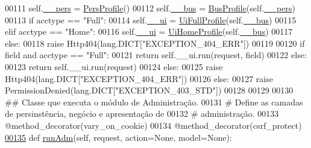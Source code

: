 \begin{DoxyCode}
00111                     self.\hyperlink{classELO_1_1MainUnit_1_1Factory_a68f6640ad3b515e1b8cd48d1554c0779}{\_\_pers} = \hyperlink{classProfile_1_1ProfileUnit_1_1PersProfile}{PersProfile}()
00112                     self.\hyperlink{classELO_1_1MainUnit_1_1Factory_a6a0b7b93046e095779ba54e0a8a4d02c}{\_\_bus} = \hyperlink{classProfile_1_1ProfileUnit_1_1BusProfile}{BusProfile}(self.\hyperlink{classELO_1_1MainUnit_1_1Factory_a68f6640ad3b515e1b8cd48d1554c0779}{\_\_pers})
00113                 \textcolor{keywordflow}{if} acctype == \textcolor{stringliteral}{"Full"}:
00114                     self.\hyperlink{classELO_1_1MainUnit_1_1Factory_a189a44a11e1a66ba69663eb2c598dd7c}{\_\_ui} = \hyperlink{classProfile_1_1ProfileUnit_1_1UiFullProfile}{UiFullProfile}(self.\hyperlink{classELO_1_1MainUnit_1_1Factory_a6a0b7b93046e095779ba54e0a8a4d02c}{\_\_bus})
00115                 \textcolor{keywordflow}{elif} acctype == \textcolor{stringliteral}{"Home"}:
00116                     self.\hyperlink{classELO_1_1MainUnit_1_1Factory_a189a44a11e1a66ba69663eb2c598dd7c}{\_\_ui} = \hyperlink{classProfile_1_1ProfileUnit_1_1UiHomeProfile}{UiHomeProfile}(self.\hyperlink{classELO_1_1MainUnit_1_1Factory_a6a0b7b93046e095779ba54e0a8a4d02c}{\_\_bus})
00117                 \textcolor{keywordflow}{else}:
00118                     \textcolor{keywordflow}{raise} Http404(lang.DICT[\textcolor{stringliteral}{"EXCEPTION\_404\_ERR"}])
00119             
00120                 \textcolor{keywordflow}{if} field \textcolor{keywordflow}{and} acctype == \textcolor{stringliteral}{"Full"}:
00121                     \textcolor{keywordflow}{return} self.\_\_ui.run(request, field)
00122                 \textcolor{keywordflow}{else}:
00123                     \textcolor{keywordflow}{return} self.\_\_ui.run(request)
00124             \textcolor{keywordflow}{else}:
00125                 \textcolor{keywordflow}{raise} Http404(lang.DICT[\textcolor{stringliteral}{"EXCEPTION\_404\_ERR"}])
00126         \textcolor{keywordflow}{else}:
00127             \textcolor{keywordflow}{raise} PermissionDenied(lang.DICT[\textcolor{stringliteral}{"EXCEPTION\_403\_STD"}])
00128         
00129 
00130     \textcolor{comment}{## Classe que executa o módulo de Administração.}
00131     \textcolor{comment}{#   Define as camadas de persinstência, negócio e apresentação de}
00132     \textcolor{comment}{#   administração.}
00133     @method\_decorator(vary\_on\_cookie)
00134     @method\_decorator(csrf\_protect)
\hypertarget{MainUnit_8py_source_l00135}{}\hyperlink{classELO_1_1MainUnit_1_1Factory_a533b402a54bf6f6715824a8687fa7a24}{00135}     \textcolor{keyword}{def }\hyperlink{classELO_1_1MainUnit_1_1Factory_a533b402a54bf6f6715824a8687fa7a24}{runAdm}(self, request, action=None, model=None):

\end{DoxyCode}
